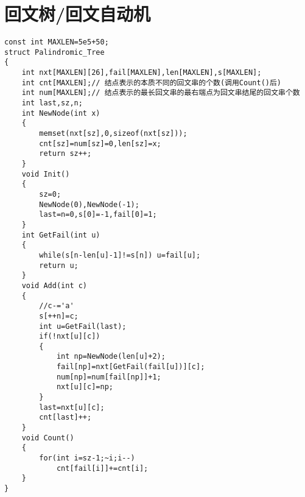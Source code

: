 \section{回文树/回文自动机}
\begin{lstlisting}
const int MAXLEN=5e5+50;
struct Palindromic_Tree
{
    int nxt[MAXLEN][26],fail[MAXLEN],len[MAXLEN],s[MAXLEN];
    int cnt[MAXLEN];// 结点表示的本质不同的回文串的个数(调用Count()后) 
    int num[MAXLEN];// 结点表示的最长回文串的最右端点为回文串结尾的回文串个数 
    int last,sz,n;
    int NewNode(int x)
    {
        memset(nxt[sz],0,sizeof(nxt[sz]));
        cnt[sz]=num[sz]=0,len[sz]=x;
        return sz++;
    }
    void Init()
    {
        sz=0;
        NewNode(0),NewNode(-1);
        last=n=0,s[0]=-1,fail[0]=1;
    }
    int GetFail(int u)
    {
        while(s[n-len[u]-1]!=s[n]) u=fail[u];
        return u;
    }
    void Add(int c)
    {
        //c-='a'
        s[++n]=c;
        int u=GetFail(last);
        if(!nxt[u][c])
        {
            int np=NewNode(len[u]+2);
            fail[np]=nxt[GetFail(fail[u])][c];
            num[np]=num[fail[np]]+1;
            nxt[u][c]=np;
        }
        last=nxt[u][c];
        cnt[last]++;
    }
    void Count()
    {
        for(int i=sz-1;~i;i--)
            cnt[fail[i]]+=cnt[i];
    }
}
\end{lstlisting}